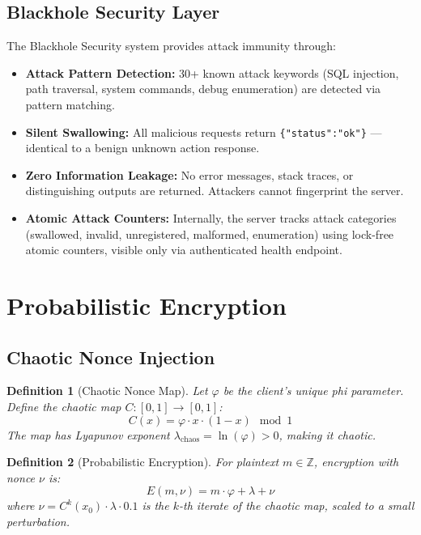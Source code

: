 \documentclass{article}
\newtheorem{definition}{Definition}[section]
\begin{document}
\subsection{Blackhole Security Layer}

The Blackhole Security system provides attack immunity through:

\begin{itemize}
    \item \textbf{Attack Pattern Detection:} 30+ known attack keywords (SQL injection, path traversal, system commands, debug enumeration) are detected via pattern matching.
    \item \textbf{Silent Swallowing:} All malicious requests return \texttt{\{"status":"ok"\}} — identical to a benign unknown action response.
    \item \textbf{Zero Information Leakage:} No error messages, stack traces, or distinguishing outputs are returned. Attackers cannot fingerprint the server.
    \item \textbf{Atomic Attack Counters:} Internally, the server tracks attack categories (swallowed, invalid, unregistered, malformed, enumeration) using lock-free atomic counters, visible only via authenticated health endpoint.
\end{itemize}

\section{Probabilistic Encryption}

\subsection{Chaotic Nonce Injection}

\begin{definition}[Chaotic Nonce Map]
Let $\varphi$ be the client's unique phi parameter. Define the chaotic map $C: [0,1] \to [0,1]$:
\begin{equation}
C(x) = \varphi \cdot x \cdot (1 - x) \mod 1
\end{equation}
The map has Lyapunov exponent $\lambda_{\text{chaos}} = \ln(\varphi) > 0$, making it chaotic.
\end{definition}

\begin{definition}[Probabilistic Encryption]
For plaintext $m \in \mathbb{Z}$, encryption with nonce $\nu$ is:
\begin{equation}
E(m, \nu) = m \cdot \varphi + \lambda + \nu
\end{equation}
where $\nu = C^k(x_0) \cdot \lambda \cdot 0.1$ is the $k$-th iterate of the chaotic map, scaled to a small perturbation.
\end{definition}
\end{document}
